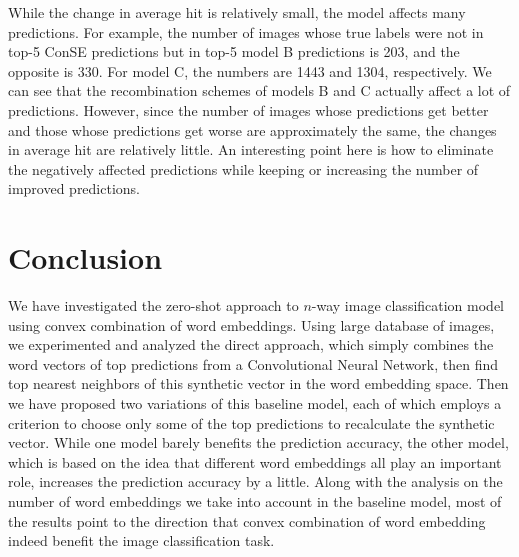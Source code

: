 \documentclass[11pt,letterpaper]{article}
\begin{document}
While the change in average hit is relatively small, the model affects many predictions. For example,
the number of images whose true labels were not in top-5 ConSE predictions but in top-5 model B predictions is 203, and the opposite is 330. 
For model C, the numbers are 1443 and 1304, respectively.
We can see that the recombination schemes of models B and C actually affect a lot of predictions. However, since the number of images whose predictions get better and those whose predictions get worse are approximately the same, the changes in average hit are relatively little. An interesting point here is how to eliminate the negatively affected predictions while keeping or increasing the number of improved predictions.


\section{Conclusion}
We have investigated the zero-shot approach to $n$-way image classification model using convex combination of word embeddings. 
Using large database of images, we experimented and analyzed the direct approach, which simply combines the word vectors of top predictions from a Convolutional Neural Network, then find top nearest neighbors of this synthetic vector in the word embedding space.
Then we have proposed two variations of this baseline model, each of which employs a criterion to choose only some of the top predictions to recalculate the synthetic vector.
While one model barely benefits the prediction accuracy, the other model, which is based on the idea that different word embeddings all play an important role, increases the prediction accuracy by a little. Along with the analysis on the number of word embeddings we take into account in the baseline model, most of the results point to the direction that convex combination of word embedding indeed benefit the image classification task.
\end{document}

